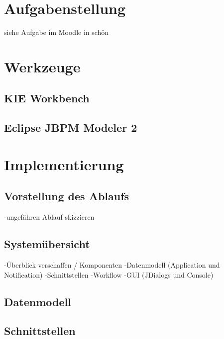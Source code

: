



\setcounter{secnumdepth}{3}
\setcounter{tocdepth}{2}

\pagestyle{empty}


\tableofcontents
\setcounter{page}{1}

\pagestyle{scrheadings}

\newpage

\section{Aufgabenstellung}
siehe Aufgabe im Moodle in schön

\section{Werkzeuge}
\subsection{KIE Workbench}
\subsection{Eclipse JBPM Modeler 2}


\section{Implementierung}
\subsection{Vorstellung des Ablaufs}
	-ungefähren Ablauf skizzieren
\subsection{Systemübersicht}
	-Überblick verschaffen / Komponenten
		-Datenmodell (Application und Notification)
		-Schnittstellen
		-Workflow
		-GUI (JDialogs und Console)

\subsection{Datenmodell}

\subsection{Schnittstellen}


